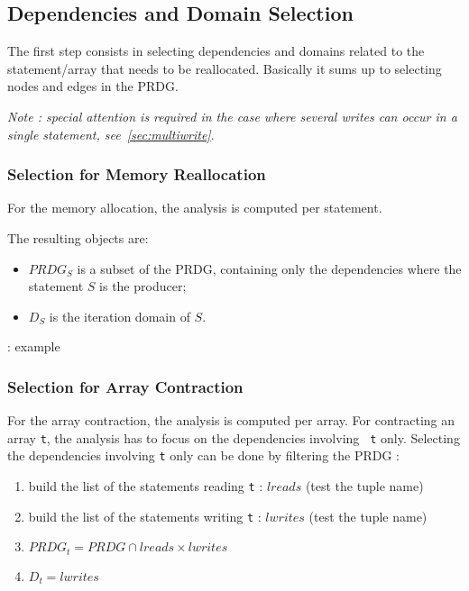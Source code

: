 \documentclass{article}
\newcommand{\TODO}[0]{\textbf{\color{red}{TODO}}}
\begin{document}
\subsection{Dependencies and Domain Selection}

The first step consists in selecting dependencies and domains related to the
statement/array that needs to be reallocated. Basically it sums up to selecting
nodes and edges in the PRDG.

\emph{Note : special attention is required in the case where several writes can
occur in a single statement, see~\ref{sec:multiwrite}}.

\subsubsection{Selection for Memory Reallocation}

For the memory allocation, the analysis is computed per statement.

\TODO

The resulting objects are:
\begin{itemize}
  \item $PRDG_S$ is a subset of the PRDG, containing only the dependencies where
  the statement $S$ is the producer;
  \item $D_S$ is the iteration domain of $S$.
\end{itemize}

\TODO : example

\subsubsection{Selection for Array Contraction}

For the array contraction, the analysis is computed per array. For contracting
an array {\tt t}, the analysis has to focus on the dependencies involving {\tt
t} only. Selecting the dependencies involving {\tt t} only can be done by
filtering the PRDG :
\begin{enumerate}
\item build the list of the statements reading {\tt t} : $lreads$ (test the
tuple name)
\item build the list of the statements writing {\tt t} : $lwrites$ (test the
tuple name)
\item $PRDG_t = PRDG \cap lreads \times lwrites$
\item $D_t = lwrites$
\end{enumerate}
\end{document}

